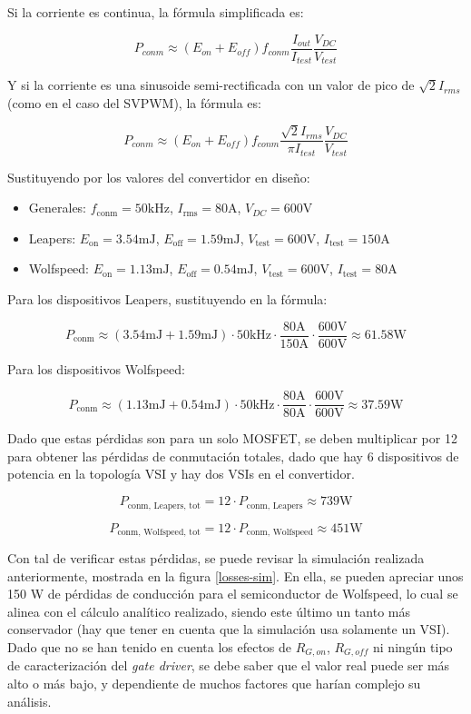 Si la corriente es continua, la fórmula simplificada es:

\[
P_{conm} \approx (E_{on} + E_{off}) f_{conm} \frac{I_{out}}{I_{test}} \frac{V_{DC}}{V_{test}}
\]

Y si la corriente es una sinusoide semi-rectificada con un valor de pico de \(\sqrt{2} I_{rms}\) (como en el caso del SVPWM), la fórmula es:

\[
P_{conm} \approx (E_{on} + E_{off}) f_{conm} \frac{\sqrt{2} I_{rms}}{\pi I_{test}} \frac{V_{DC}}{V_{test}}
\]

Sustituyendo por los valores del convertidor en diseño:

\begin{itemize}
	\item Generales: \(f_{\text{conm}} = 50 \text{kHz}\), \(I_{\text{rms}} = 80 \text{A}\), \(V_{DC} = 600 \text{V}\)
	\item Leapers: \(E_{\text{on}} = 3.54 \text{mJ}\), \(E_{\text{off}} = 1.59 \text{mJ}\), \(V_{\text{test}} = 600 \text{V}\), \(I_{\text{test}} = 150 \text{A}\)
	\item Wolfspeed: \(E_{\text{on}} = 1.13 \text{mJ}\), \(E_{\text{off}} = 0.54 \text{mJ}\), \(V_{\text{test}} = 600 \text{V}\), \(I_{\text{test}} = 80 \text{A}\)
\end{itemize}

Para los dispositivos Leapers, sustituyendo en la fórmula:

\[
P_{\text{conm}} \approx (3.54 \text{mJ} + 1.59 \text{mJ}) \cdot 50 \text{kHz} \cdot \frac{80 \text{A}}{150 \text{A}} \cdot \frac{600 \text{V}}{600 \text{V}} \approx 61.58 \text{W}
\]

Para los dispositivos Wolfspeed:

\[
P_{\text{conm}} \approx (1.13 \text{mJ} + 0.54 \text{mJ}) \cdot 50 \text{kHz} \cdot \frac{80  \text{A}}{80 \text{A}} \cdot \frac{600 \text{V}}{600 \text{V}} \approx 37.59 \text{W}
\]

Dado que estas pérdidas son para un solo MOSFET, se deben multiplicar por 12 para obtener las pérdidas de conmutación totales, dado que hay 6 dispositivos de potencia en la topología VSI y hay dos VSIs en el convertidor.

\[
P_{\text{conm, Leapers, tot}} = 12\cdot P_{\text{conm, Leapers}} \approx 739 \text{W}
\]

\[
P_{\text{conm, Wolfspeed, tot}} = 12\cdot P_{\text{conm, Wolfspeed}} \approx 451 \text{W}
\]

Con tal de verificar estas pérdidas, se puede revisar la simulación realizada anteriormente, mostrada en la figura \ref{losses-sim}. En ella, se pueden apreciar unos 150 W de pérdidas de conducción para el semiconductor de Wolfspeed, lo cual se alinea con el cálculo analítico realizado, siendo este último un tanto más conservador (hay que tener en cuenta que la simulación usa solamente un VSI). Dado que no se han tenido en cuenta los efectos de $R_{G, on}$, $R_{G, off}$ ni ningún tipo de caracterización del \textit{gate driver}, se debe saber que el valor real puede ser más alto o más bajo, y dependiente de muchos factores que harían complejo su análisis.


